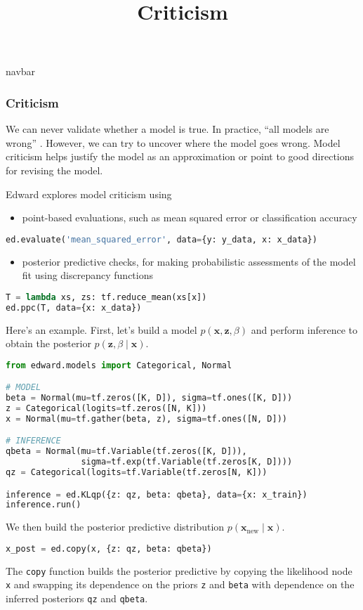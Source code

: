\title{Criticism}

{{navbar}}

\subsubsection{Criticism}

We can never validate whether a model is true. In practice, ``all
models are wrong'' \citep{box1976science}. However, we can try to
uncover where the model goes wrong. Model criticism helps justify the
model as an approximation or point to good directions for revising the
model.

Edward explores model criticism using
\begin{itemize}
  \item point-based evaluations, such as mean squared error or
  classification accuracy
\end{itemize}
\begin{lstlisting}[language=Python]
ed.evaluate('mean_squared_error', data={y: y_data, x: x_data})
\end{lstlisting}
\begin{itemize}
  \item posterior predictive checks, for making probabilistic
  assessments of the model fit using discrepancy functions
\end{itemize}
\begin{lstlisting}[language=Python]
T = lambda xs, zs: tf.reduce_mean(xs[x])
ed.ppc(T, data={x: x_data})
\end{lstlisting}

Here's an example. First, let's build a model $p(\mathbf{x},
\mathbf{z}, \beta)$ and perform inference to obtain the posterior
$p(\mathbf{z}, \beta\mid\mathbf{x})$.
\begin{lstlisting}[language=Python]
from edward.models import Categorical, Normal

# MODEL
beta = Normal(mu=tf.zeros([K, D]), sigma=tf.ones([K, D]))
z = Categorical(logits=tf.zeros([N, K]))
x = Normal(mu=tf.gather(beta, z), sigma=tf.ones([N, D]))

# INFERENCE
qbeta = Normal(mu=tf.Variable(tf.zeros([K, D])),
               sigma=tf.exp(tf.Variable(tf.zeros[K, D])))
qz = Categorical(logits=tf.Variable(tf.zeros[N, K]))

inference = ed.KLqp({z: qz, beta: qbeta}, data={x: x_train})
inference.run()
\end{lstlisting}
We then build the posterior predictive distribution
$p(\mathbf{x}_{\text{new}}\mid \mathbf{x})$.
\begin{lstlisting}[language=Python]
x_post = ed.copy(x, {z: qz, beta: qbeta})
\end{lstlisting}
The \texttt{copy} function builds the posterior predictive by copying
the likelihood node \texttt{x} and swapping its dependence on the
priors \texttt{z} and \texttt{beta} with dependence on the inferred
posteriors \texttt{qz} and \texttt{qbeta}.


